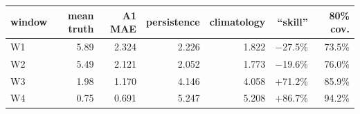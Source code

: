 \begin{tabular}{lrrrrrr}
\toprule
window & mean truth & A1 MAE & persistence & climatology & ``skill'' & 80\% cov. \\
\midrule
  W1 & 5.89 & 2.324 & 2.226 & 1.822 & $-$27.5\% & 73.5\% \\
  W2 & 5.49 & 2.121 & 2.052 & 1.773 & $-$19.6\% & 76.0\% \\
  W3 & 1.98 & 1.170 & 4.146 & 4.058 & +71.2\% & 85.9\% \\
  W4 & 0.75 & 0.691 & 5.247 & 5.208 & +86.7\% & 94.2\% \\
\bottomrule
\end{tabular}
